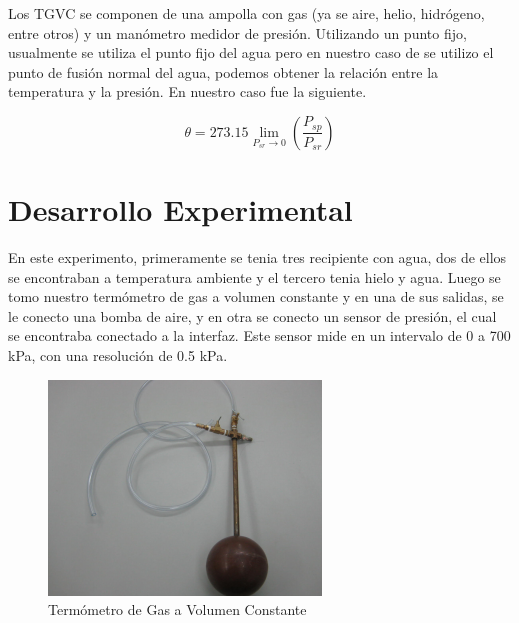 \documentclass[12pt]{article}
\begin{document}
Los TGVC se componen de una ampolla con gas (ya se aire, helio, hidrógeno, entre otros) y un manómetro medidor de presión. Utilizando un punto fijo, usualmente se utiliza el punto fijo del agua pero en nuestro caso de se utilizo el punto de fusión normal del agua, podemos obtener la relación entre la temperatura y la presión. En nuestro caso fue la siguiente.

\begin{equation}\label{temlim}
\theta = 273.15 \lim_{P_{sr}\rightarrow 0} \left(\frac{P_{sp}}{P_{sr}} \right)
\end{equation}

\section{Desarrollo Experimental}
En este experimento, primeramente se tenia tres recipiente con agua, dos de ellos se encontraban a temperatura ambiente y el tercero tenia hielo y agua. Luego se tomo nuestro termómetro de gas a volumen constante y en una de sus salidas, se le conecto una bomba de aire, y en otra se conecto un sensor de presión, el cual se encontraba conectado a la interfaz. Este sensor mide en un intervalo de 0 a 700 kPa, con una resolución de 0.5 kPa\cite{man}.

\begin{figure}[H]
\centering
\includegraphics[scale=0.5]{TGVC.png}
\caption{Termómetro de Gas a Volumen Constante}
\end{figure}
\end{document}
